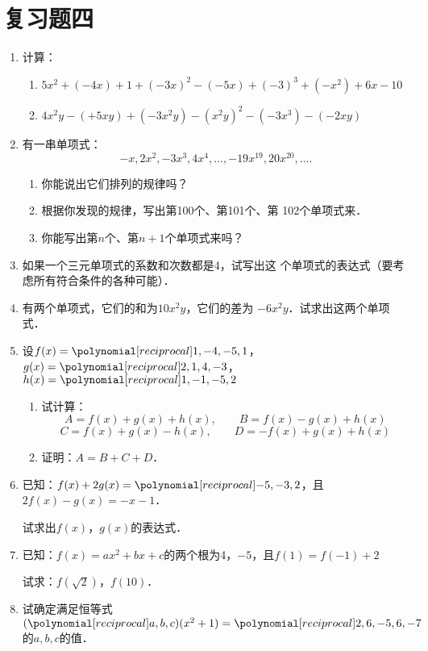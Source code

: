 \section*{复习题四}
\begin{enumerate}
    \item 计算：
    \begin{enumerate}
        \item $5x^2+(-4x)+1+(-3x)^2-(-5x)+(-3)^3+(-x^2)+6x-10$
        \item $4x^2y-(+5xy)+(-3x^2y)-(x^2y)^2-(-3x^3)-(-2xy)$
    \end{enumerate}
\item 有一串单项式：
\[-x,2x^2,-3x^3,4x^4,\ldots,-19x^{19},20x^{20},\ldots. \]
\begin{enumerate}
    \item 你能说出它们排列的规律吗？
    \item 根据你发现的规律，写出第100个、第101个、第
102个单项式来．
\item 你能写出第$n$个、第$n+1$个单项式来吗？
\end{enumerate}

\item 如果一个三元单项式的系数和次数都是4，试写出这
个单项式的表达式（要考虑所有符合条件的各种可能）．
\item  有两个单项式，它们的和为$10x^2y$，它们的差为
$-6x^2y$．试求出这两个单项式．

\item 设$f(x)=\poly{1,-4,-5,1}$，$g(x)=\poly{2,1,4,-3}$，$h(x)=\poly{1,-1,-5,2}$
\begin{enumerate}
    \item 试计算：
    \[A=f(x)+g(x)+h(x),\qquad B=f(x)-g(x)+h(x)\]
    \[C=f(x)+g(x)-h(x),\qquad D=-f(x)+g(x)+h(x)\]
    \item 证明：$A=B+C+D$．
\end{enumerate}

\item 已知：$f(x)+2g(x)=\poly{-5,-3,2}$，且$2f(x)-g(x)=-x-1$．

试求出$f(x)$，$g(x)$的表达式．

\item 已知：$f(x)=ax^2+bx+c$的两个根为4，$-5$，且$f(1)=f(-1)+2$

试求：$f\left(\sqrt{2}\right)$，$f(10)$．

\item 试确定满足恒等式
$(\poly{a,b,c})(x^2+1)=\poly{2,6,-5,6,-7}$
的$a,b,c$的值．


\end{enumerate}
